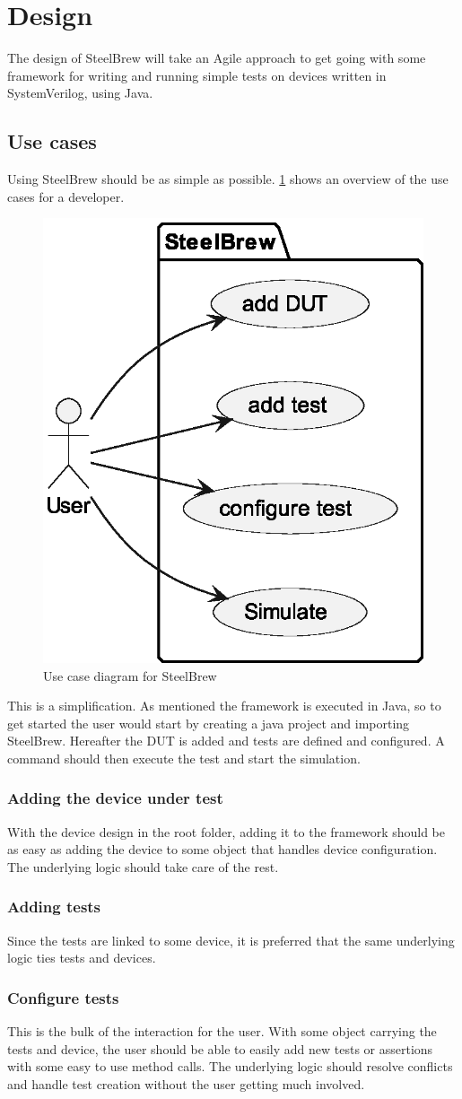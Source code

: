 \section{Design}\label{sec:05}
The design of SteelBrew will take an Agile approach to get going with some framework for writing and running simple tests on devices written in SystemVerilog, using Java.
\subsection{Use cases}
Using SteelBrew should be as simple as possible. \cref{fig:usecases} shows an overview of the use cases for a developer.
\begin{figure}
    \centering
    \caption{Use case diagram for SteelBrew}\label{fig:usecases}
    \includegraphics[width=.3\textwidth]{out/plantuml/usecase/usecase.eps}
\end{figure}
This is a simplification. As mentioned the framework is executed in Java, so to get started the user would start by creating a java project and importing SteelBrew. Hereafter the DUT is added and tests are defined and configured. A command should then execute the test and start the simulation.
\subsubsection{Adding the device under test}
With the device design in the root folder, adding it to the framework should be as easy as adding the device to some object that handles device configuration. The underlying logic should take care of the rest.
\subsubsection{Adding tests}
Since the tests are linked to some device, it is preferred that the same underlying logic ties tests and devices.
\subsubsection{Configure tests}
This is the bulk of the interaction for the user. With some object carrying the tests and device, the user should be able to easily add new tests or assertions with some easy to use method calls. The underlying logic should resolve conflicts and handle test creation without the user getting much involved.
